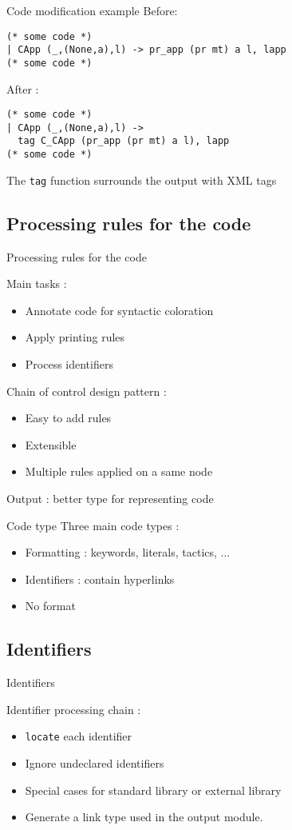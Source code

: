 \documentclass[compress]{beamer}
\newenvironment{tframe}[1]{
  \subsection{#1}
  \begin{frame}{#1}
  }{
  \end{frame}
  }
\begin{document}
  \begin{frame}[containsverbatim]{Code modification example}
  Before:
    \begin{lstlisting}
(* some code *)
| CApp (_,(None,a),l) -> pr_app (pr mt) a l, lapp
(* some code *)
    \end{lstlisting}

    After :
    \begin{lstlisting}
(* some code *)
| CApp (_,(None,a),l) ->
  tag C_CApp (pr_app (pr mt) a l), lapp
(* some code *)
    \end{lstlisting}

    The \texttt{tag} function surrounds the output with XML tags
  \end{frame}

  \begin{tframe}{Processing rules for the code}
    Main tasks :
    \begin{itemize}
      \item Annotate code for syntactic coloration
      \item Apply printing rules
      \item Process identifiers
    \end{itemize}
    \vfill
    Chain of control design pattern :
    \begin{itemize}
      \item Easy to add rules
      \item Extensible
      \item Multiple rules applied on a same node
    \end{itemize}
    Output : better type for representing code
  \end{tframe}

  \begin{frame}{Code type}
    Three main code types :
    \begin{itemize}
      \item Formatting : keywords, literals, tactics, $\ldots$
      \item Identifiers : contain hyperlinks
      \item No format
    \end{itemize}
  \end{frame}

  \begin{tframe}{Identifiers}
    Identifier processing chain :
    \begin{itemize}
      \item \texttt{locate} each identifier
      \item Ignore undeclared identifiers
      \item Special cases for standard library or external library
      \item Generate a link type used in the output module.
    \end{itemize}
  \end{tframe}
\end{document}
